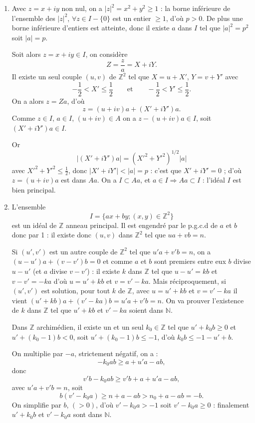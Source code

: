 \begin{enumerate}[label=\arabic*.,leftmargin=2.2em,itemsep=1.15em]
\begin{enumerate}[label=\alph*),leftmargin=2em]
Si $x\in\mathcal R(n\mathbb Z)$, $\exists p\in\mathbb N$, $x^p\in n\mathbb Z$ ce qui équivaut à $n$ divise $x^p$. Mais ceci implique que chaque $n_i$ premier divise $x$, et si $x$ est divisible par $n_1,\ldots,n_q$, $x^{\sup(\alpha_i)}$ sera divisible par $n$. Donc
\[
\mathcal R(n\mathbb Z)=n_1n_2\cdots n_q\mathbb Z;
\]
$n_1,n_2,\ldots,n_q$ facteurs premiers distincts divisant $n$.
\end{enumerate}

\item Avec $z=x+iy$ non nul, on a $|z|^2=x^2+y^2\ge1$ : la borne inférieure de l'ensemble des $|z|^2$, $\forall z\in I-\{0\}$ est un entier $\ge1$, d'où $p>0$. De plus une borne inférieure d'entiers est atteinte, donc il existe $a$ dans $I$ tel que $|a|^2=p^2$ soit $|a|=p$.

Soit alors $z=x+iy\in I$, on considère
\[
Z=\frac za=X+iY.
\]
Il existe un seul couple $(u,v)$ de $\mathbb Z^2$ tel que $X=u+X'$, $Y=v+Y'$ avec
\[
-\frac12<X'\le\frac12\qquad\text{et}\qquad-\frac12<Y'\le\frac12.
\]
On a alors $z=Za$, d'où
\[
z=(u+iv)a+(X'+iY')a.
\]
Comme $z\in I$, $a\in I$, $(u+iv)\in A$ on a $z-(u+iv)a\in I$, soit $(X'+iY')a\in I$.

Or
\[
|(X'+iY')a|=(X'^2+Y'^2)^{1/2}|a|
\]
avec $X'^2+Y'^2\le\frac12$, donc $|X'+iY'|<|a|=p$ : c'est que $X'+iY'=0$ ; d'où $z=(u+iv)a$ est dans $Aa$. On a $I\subset Aa$, et $a\in I\Rightarrow Aa\subset I$ : l'idéal $I$ est bien principal.

\item L'ensemble
\[
I=\{ax+by;(x,y)\in\mathbb Z^2\}
\]
est un idéal de $\mathbb Z$ anneau principal. Il est engendré par le p.g.c.d de $a$ et $b$ donc par 1 : il existe donc $(u,v)$ dans $\mathbb Z^2$ tel que $ua+vb=n$.

Si $(u',v')$ est un autre couple de $\mathbb Z^2$ tel que $u'a+v'b=n$, on a $(u-u')a+(v-v')b=0$ et comme $a$ et $b$ sont premiers entre eux $b$ divise $u-u'$ (et $a$ divise $v-v'$) : il existe $k$ dans $\mathbb Z$ tel que $u-u'=kb$ et $v-v'=-ka$ d'où $u=u'+kb$ et $v=v'-ka$. Mais réciproquement, si $(u',v')$ est solution, pour tout $k$ de $\mathbb Z$, avec $u=u'+kb$ et $v=v'-ka$ il vient $(u'+kb)a+(v'-ka)b=u'a+v'b=n$. On va prouver l'existence de $k$ dans $\mathbb Z$ tel que $u'+kb$ et $v'-ka$ soient dans $\mathbb N$.

Dans $\mathbb Z$ archimédien, il existe un et un seul $k_0\in\mathbb Z$ tel que $u'+k_0b\ge0$ et $u'+(k_0-1)b<0$, soit $u'+(k_0-1)b\le-1$, d'où $k_0b\le-1-u'+b$.

On multiplie par $-a$, strictement négatif, on a :
\[
-k_0ab\ge a+u'a-ab,
\]
donc
\[
v'b-k_0ab\ge v'b+a+u'a-ab,
\]
avec $u'a+v'b=n$, soit
\[
b(v'-k_0a)\ge n+a-ab>n_0+a-ab=-b.
\]
On simplifie par $b$, $(>0)$, d'où $v'-k_0a>-1$ soit $v'-k_0a\ge0$ : finalement $u'+k_0b$ et $v'-k_0a$ sont dans $\mathbb N$.


\end{enumerate}
